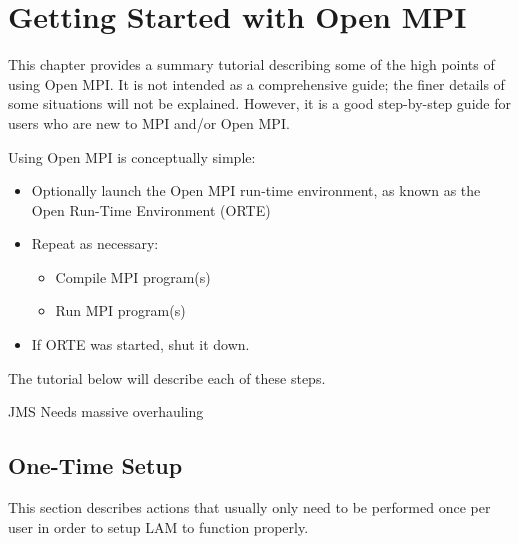 %
% 
% 
%

\chapter{Getting Started with Open MPI}
\label{sec:getting-started}

This chapter provides a summary tutorial describing some of the high
points of using Open MPI.  It is not intended as a comprehensive
guide; the finer details of some situations will not be explained.
However, it is a good step-by-step guide for users who are new to MPI
and/or Open MPI.

Using Open MPI is conceptually simple:

\begin{itemize}
\item Optionally launch the Open MPI run-time environment, as known as
  the Open Run-Time Environment (ORTE)
\item Repeat as necessary:
  \begin{itemize}
  \item Compile MPI program(s)
  \item Run MPI program(s)
  \end{itemize}
\item If ORTE was started, shut it down.
\end{itemize}

The tutorial below will describe each of these steps.  

{\Huge JMS Needs massive overhauling}


\section{One-Time Setup}

This section describes actions that usually only need to be performed
once per user in order to setup LAM to function properly.

